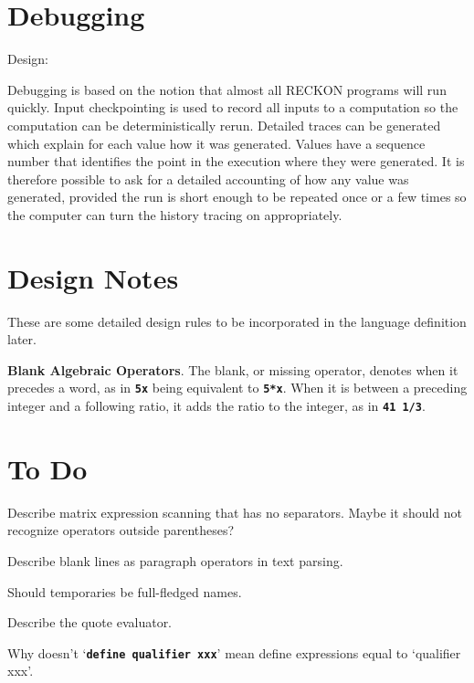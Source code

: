 \documentclass[12pt]{article}
\newcommand{\TT}[1]{{\tt \bfseries #1}}
\newcommand{\EOL}{\penalty \exhyphenpenalty}
\begin{document}
\section{Debugging}

Design:

Debugging is based on the notion that almost all
RECKON programs will run quickly.
Input checkpointing is used to record all inputs to a computation
so the computation can be deterministically rerun.  Detailed
traces can be generated which explain for each value how it was generated.
Values have a sequence number that identifies the point in the execution
where they were generated.  It is therefore possible to ask for a detailed
accounting of how any value was generated, provided the run is short enough
to be repeated once or a few times so the computer can turn the history
tracing on appropriately.

\section{Design Notes}

These are some detailed design rules to be incorporated in the language
definition later.

\begin{list}{}{}

\item
{\bf Blank Algebraic Operators}.
The blank, or missing operator, denotes \TT{*} when it precedes a word,
as in \TT{5x} being equivalent to \TT{5*x}.  When it is between a
preceding integer and a following ratio, it adds the ratio to the integer,
as in \TT{41 1/3}.

\end{list}

\section{To Do}

Describe matrix expression scanning that has no separators.
Maybe it should not recognize operators outside parentheses?

Describe blank lines as paragraph operators in text parsing.

Should temporaries be full-fledged names.

Describe the quote evaluator.\label{QUOTE-EVALUATOR}

Why doesn't `\TT{define qualifier xxx}' mean define expressions equal
to `{qual\-i\-fier\EOL{} xxx}'.
\end{document}
